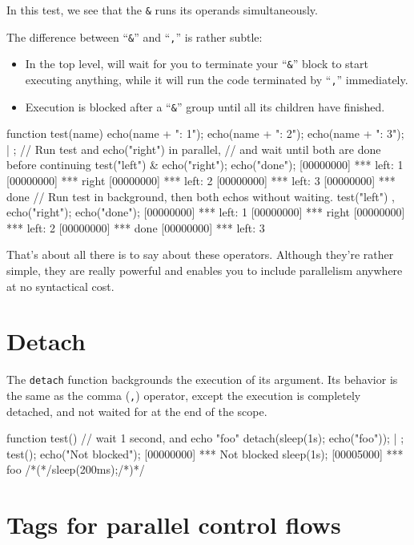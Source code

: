 In this test, we see that the \lstinline{&} runs its operands
simultaneously.

The difference between ``\lstinline{&}'' and ``\lstinline{,}'' is
rather subtle:

\begin{itemize}
\item In the top level, will wait for you to terminate your
  ``\lstinline{&}'' block to start executing anything, while it will
  run the code terminated by ``\lstinline{,}'' immediately.
\item Execution is blocked after a ``\lstinline{&}'' group until all
  its children have finished.
\end{itemize}

\begin{urbiscript}
function test(name)
{
  echo(name + ": 1");
  echo(name + ": 2");
  echo(name + ": 3");
} | {};
// Run test and echo("right") in parallel,
// and wait until both are done before continuing
test("left") & echo("right"); echo("done");
[00000000] *** left: 1
[00000000] *** right
[00000000] *** left: 2
[00000000] *** left: 3
[00000000] *** done
// Run test in background, then both echos without waiting.
test("left") , echo("right"); echo("done");
[00000000] *** left: 1
[00000000] *** right
[00000000] *** left: 2
[00000000] *** done
[00000000] *** left: 3
\end{urbiscript}

That's about all there is to say about these operators. Although
they're rather simple, they are really powerful and enables you to
include parallelism anywhere at no syntactical cost.

\section{Detach}

The \lstinline{detach} function backgrounds the execution of its
argument. Its behavior is the same as the comma (\lstinline{,}) operator,
except the execution is completely detached, and not waited for at the
end of the scope.

\begin{urbiscript}
function test()
{
  // wait 1 second, and echo "foo"
  detach({sleep(1s); echo("foo")});
} | {};
test();
echo("Not blocked");
[00000000] *** Not blocked
sleep(1s);
[00005000] *** foo
/*(*/sleep(200ms);/*)*/
\end{urbiscript}

\section{Tags for parallel control flows}
\label{sec:tut:tags}

